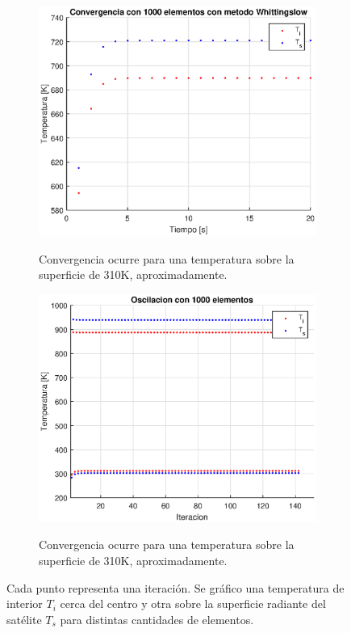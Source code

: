 \documentclass[onecolumn,10pt,titlepage,a4paper]{article}
\begin{document}
\begin{figure}[htb!]
	\centering
	\begin{subfigure}{0.49\textwidth}
	\centering
\includegraphics[width=\linewidth]{fig/conv1000.eps}
\label{fig:Convergencia1000}
\caption{Convergencia ocurre para una temperatura sobre la superficie de 310K,
	aproximadamente.}
	\end{subfigure}
	\hfill
	\begin{subfigure}{0.49\textwidth}
	\centering
	\includegraphics[width=\linewidth]{fig/osc1000.eps}
	\label{fig:Oscilacion1000}
\caption{Convergencia ocurre para una temperatura sobre la superficie de 310K,
	aproximadamente.}
	\end{subfigure}
	\caption{Cada punto representa una iteración. Se gráfico una temperatura de interior $T_i$ cerca del centro y otra sobre la superficie radiante del satélite $T_s$ para distintas cantidades de elementos.}
	\label{fig:ConvergenciaTotal}
\end{figure}
\end{document}
